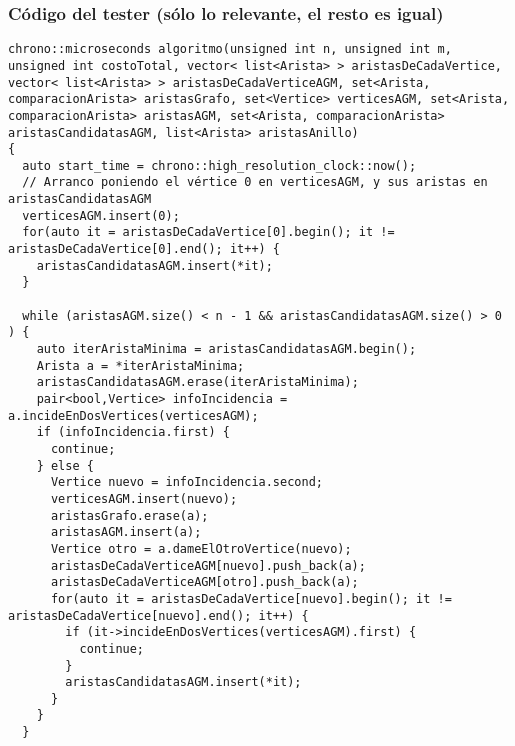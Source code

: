 \subsubsection{Código del tester (sólo lo relevante, el resto es igual)}
\begin{lstlisting}[frame=single]
chrono::microseconds algoritmo(unsigned int n, unsigned int m, unsigned int costoTotal, vector< list<Arista> > aristasDeCadaVertice, vector< list<Arista> > aristasDeCadaVerticeAGM, set<Arista, comparacionArista> aristasGrafo, set<Vertice> verticesAGM, set<Arista, comparacionArista> aristasAGM, set<Arista, comparacionArista> aristasCandidatasAGM, list<Arista> aristasAnillo) 
{
  auto start_time = chrono::high_resolution_clock::now();
  // Arranco poniendo el vértice 0 en verticesAGM, y sus aristas en aristasCandidatasAGM
  verticesAGM.insert(0);
  for(auto it = aristasDeCadaVertice[0].begin(); it != aristasDeCadaVertice[0].end(); it++) {
    aristasCandidatasAGM.insert(*it);
  }
  
  while (aristasAGM.size() < n - 1 && aristasCandidatasAGM.size() > 0 ) {
    auto iterAristaMinima = aristasCandidatasAGM.begin();
    Arista a = *iterAristaMinima;
    aristasCandidatasAGM.erase(iterAristaMinima);       
    pair<bool,Vertice> infoIncidencia = a.incideEnDosVertices(verticesAGM);
    if (infoIncidencia.first) {               
      continue;
    } else {
      Vertice nuevo = infoIncidencia.second;        
      verticesAGM.insert(nuevo);              
      aristasGrafo.erase(a);                
      aristasAGM.insert(a);                 
      Vertice otro = a.dameElOtroVertice(nuevo);
      aristasDeCadaVerticeAGM[nuevo].push_back(a);    
      aristasDeCadaVerticeAGM[otro].push_back(a);
      for(auto it = aristasDeCadaVertice[nuevo].begin(); it != aristasDeCadaVertice[nuevo].end(); it++) {
        if (it->incideEnDosVertices(verticesAGM).first) {
          continue;                   
        }
        aristasCandidatasAGM.insert(*it);
      }
    }
  }
  

\end{lstlisting}
